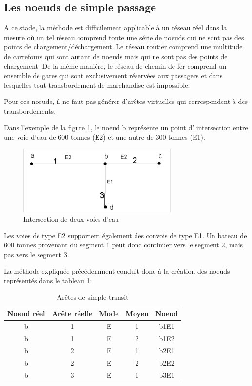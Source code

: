 \subsection{Les noeuds de simple passage}

A ce stade, la méthode est difficilement applicable à un réseau réel dans la
mesure où un tel réseau comprend toute une série de noeuds qui ne sont pas des
points de chargement/déchargement. Le réseau routier comprend une multitude de
carrefours qui sont autant de noeuds mais qui ne sont pas des points de
chargement. De la même manière, le réseau de chemin de fer comprend un ensemble
de gares qui sont exclusivement réservées aux passagers et dans les\-quelles
tout transbordement de marchandise est impossible.

Pour ces noeuds, il ne faut pas générer d'arêtes virtuelles qui
correspondent à des transbordements.

Dans l'exemple de la figure \ref{f3_8}, le noeud b représente un point d'
intersection entre une voie d'eau de 600 tonnes (E2) et une autre de 300 tonnes
(E1).


\begin{figure}[htbp]
\centerline{\includegraphics[width=8cm]{f3_8.png}}
\caption{\label{f3_8} Intersection de deux voies d'eau}
\end{figure}

Les voies de type E2 supportent également des convois de type E1.
Un bateau de 600 tonnes provenant du segment 1 peut donc continuer
vers le segment 2, mais pas vers le segment 3.

La méthode expliquée précédemment conduit donc à la création des noeuds
représentés dans le tableau \ref{tab3_6}:

\begin{table}
\begin{center}
\begin{tabular}{ccccc}
\hline
Noeud réel & Arête réelle & Mode & Moyen & Noeud\\
\hline
b & 1 & E & 1 & b1E1\\

b & 1 & E & 2 & b1E2\\

b & 2 & E & 1 & b2E1\\

b & 2 & E & 2 & b2E2\\

b & 3 & E & 1 & b3E1\\
\hline
\end{tabular}
\caption{\label{tab3_6} Ar\^etes de simple transit}
\end{center}
\end{table}




